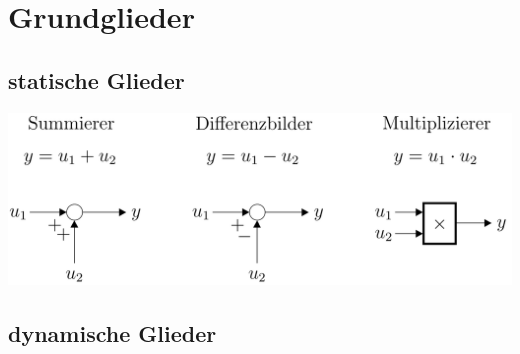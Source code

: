 \section{Grundglieder }
	\subsection{statische Glieder }
		\includegraphics[width=10 cm]{./bilder/grundglieder/statischeGlieder.png} \\
	
	\subsection{dynamische Glieder }
	
